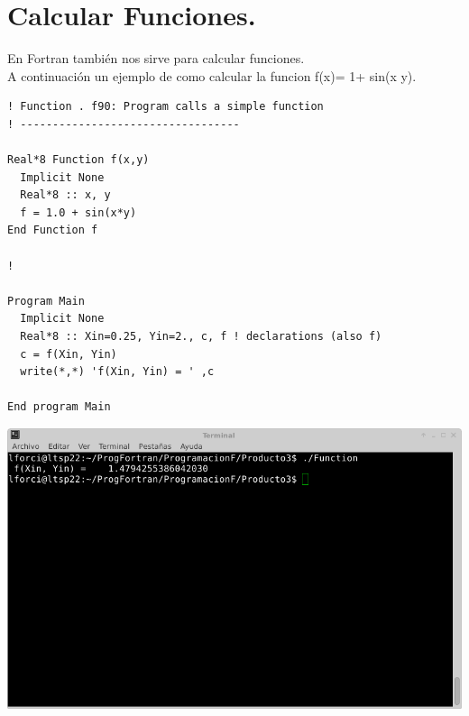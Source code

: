 \documentclass[10pt]{article}
\begin{document}
\section{Calcular Funciones.}
En Fortran también nos sirve para calcular funciones.\\
A continuación un ejemplo de como calcular la funcion f(x)= 1+ sin(x y).
\begin{verbatim}
! Function . f90: Program calls a simple function
! ----------------------------------

Real*8 Function f(x,y)
  Implicit None
  Real*8 :: x, y
  f = 1.0 + sin(x*y)
End Function f

!

Program Main
  Implicit None
  Real*8 :: Xin=0.25, Yin=2., c, f ! declarations (also f)
  c = f(Xin, Yin)
  write(*,*) 'f(Xin, Yin) = ' ,c

End program Main
\end{verbatim}
\includegraphics[scale=0.6]{Function}
\end{document}
